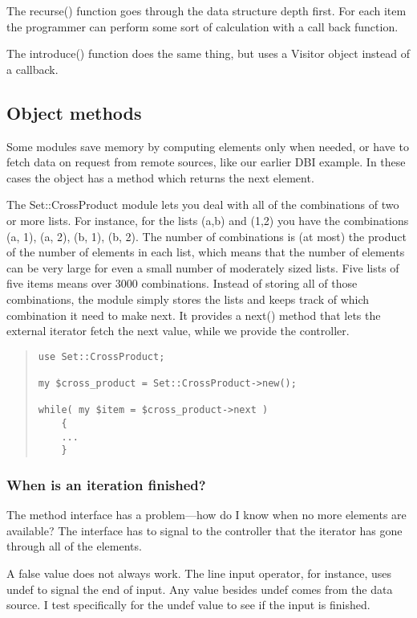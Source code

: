 The recurse() function goes through the data structure depth first. For
each item the programmer can perform some sort of calculation with
a call back function.

The introduce() function does the same thing, but uses a Visitor
object instead of a callback.

    \subsection{Object methods}
    
Some modules save memory by computing elements only when needed,
or have to fetch data on request from remote sources, like our
earlier DBI example.  In these cases the object has a method
which returns the next element.


The Set::CrossProduct module lets you deal with all of the combinations of
two or more lists.  For instance, for the lists (a,b) and (1,2) you
have the combinations (a, 1), (a, 2), (b, 1), (b, 2).  The number of
combinations is (at most) the product of the number of elements in
each list, which means that the number of elements can be very large
for even a small number of moderately sized lists.  Five lists of five
items means over 3000 combinations.  Instead of storing all of those
combinations, the module simply stores the lists and keeps track of
which combination it need to make next.  It provides a next() method
that lets the external iterator fetch the next value, while we provide
the controller.

\begin{quote}
\begin{verbatim}
use Set::CrossProduct;

my $cross_product = Set::CrossProduct->new();

while( my $item = $cross_product->next )
    {
    ...
    }
\end{verbatim}
\end{quote}

\subsubsection{When is an iteration finished?}

The method interface has a problem---how do I know when no
more elements are available?  The interface has to signal to
the controller that the iterator has gone through all of the
elements.  

A false value does not always work.  The line input operator,
for instance, uses undef to signal the end of input.  Any
value besides undef comes from the data source.  I test
specifically for the undef value to see if the input is
finished.

